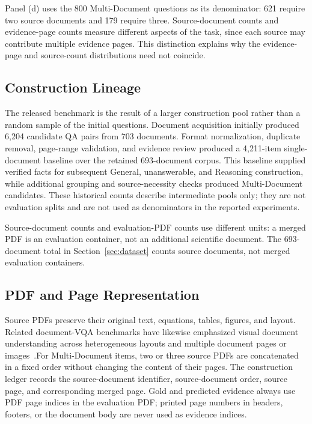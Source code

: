 \documentclass{article} %
\begin{document}
Panel (d) uses the 800 Multi-Document questions as its denominator: 621 require two source documents and 179 require three. Source-document counts and evidence-page counts measure different aspects of the task, since each source may contribute multiple evidence pages. This distinction explains why the evidence-page and source-count distributions need not coincide.

\FloatBarrier

\subsection{Construction Lineage}
\label{app:construction_lineage}

The released benchmark is the result of a larger construction pool rather than a random sample of the initial questions. Document acquisition initially produced 6,204 candidate QA pairs from 703 documents. Format normalization, duplicate removal, page-range validation, and evidence review produced a 4,211-item single-document baseline over the retained 693-document corpus. This baseline supplied verified facts for subsequent General, unanswerable, and Reasoning construction, while additional grouping and source-necessity checks produced Multi-Document candidates. These historical counts describe intermediate pools only; they are not evaluation splits and are not used as denominators in the reported experiments.

Source-document counts and evaluation-PDF counts use different units: a merged PDF is an evaluation container, not an additional scientific document. The 693-document total in Section~\ref{sec:dataset} counts source documents, not merged evaluation containers.

\subsection{PDF and Page Representation}
\label{app:page_representation}

Source PDFs preserve their original text, equations, tables, figures, and layout. Related document-VQA benchmarks have likewise emphasized visual document
understanding across heterogeneous layouts and multiple document pages or
images~\cite{mathew2022infographicvqa,tanaka2023slidevqa}.For Multi-Document items, two or three source PDFs are concatenated in a fixed order without changing the content of their pages. The construction ledger records the source-document identifier, source-document order, source page, and corresponding merged page. Gold and predicted evidence always use PDF page indices in the evaluation PDF; printed page numbers in headers, footers, or the document body are never used as evidence indices.
\end{document}
